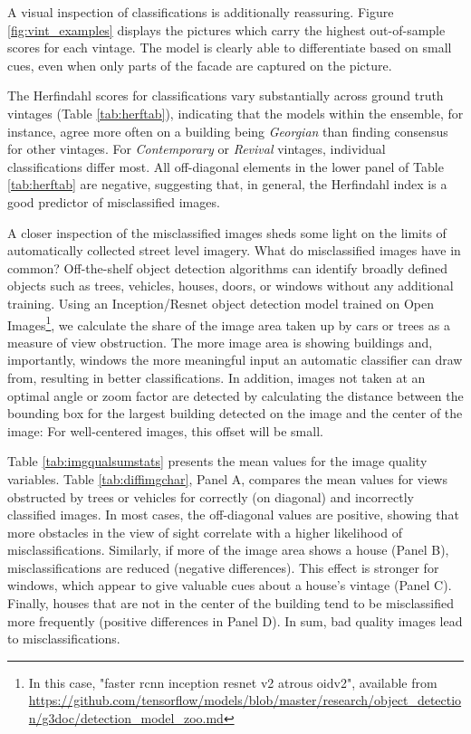 \documentclass[]{article}
\let\rmarkdownfootnote\footnote%
\def\footnote{\protect\rmarkdownfootnote}
\begin{document}
A visual inspection of classifications is additionally reassuring.
Figure \ref{fig:vint_examples} displays the pictures which carry the
highest out-of-sample scores for each vintage. The model is clearly able
to differentiate based on small cues, even when only parts of the facade
are captured on the picture.

The Herfindahl scores for classifications vary substantially across
ground truth vintages (Table \ref{tab:herftab}), indicating that the
models within the ensemble, for instance, agree more often on a building
being \emph{Georgian} than finding consensus for other vintages. For
\emph{Contemporary} or \emph{Revival} vintages, individual
classifications differ most. All off-diagonal elements in the lower
panel of Table \ref{tab:herftab} are negative, suggesting that, in
general, the Herfindahl index is a good predictor of misclassified
images.

A closer inspection of the misclassified images sheds some light on the
limits of automatically collected street level imagery. What do
misclassified images have in common? Off-the-shelf object detection
algorithms can identify broadly defined objects such as trees, vehicles,
houses, doors, or windows without any additional training. Using an
Inception/Resnet object detection model trained on Open
Images\footnote{In this case, "faster rcnn inception resnet v2 atrous oidv2", available from \url{https://github.com/tensorflow/models/blob/master/research/object_detection/g3doc/detection_model_zoo.md}},
we calculate the share of the image area taken up by cars or trees as a
measure of view obstruction. The more image area is showing buildings
and, importantly, windows the more meaningful input an automatic
classifier can draw from, resulting in better classifications. In
addition, images not taken at an optimal angle or zoom factor are
detected by calculating the distance between the bounding box for the
largest building detected on the image and the center of the image: For
well-centered images, this offset will be small.

Table \ref{tab:imgqualsumstats} presents the mean values for the image
quality variables. Table \ref{tab:diffimgchar}, Panel A, compares the
mean values for views obstructed by trees or vehicles for correctly (on
diagonal) and incorrectly classified images. In most cases, the
off-diagonal values are positive, showing that more obstacles in the
view of sight correlate with a higher likelihood of misclassifications.
Similarly, if more of the image area shows a house (Panel B),
misclassifications are reduced (negative differences). This effect is
stronger for windows, which appear to give valuable cues about a house's
vintage (Panel C). Finally, houses that are not in the center of the
building tend to be misclassified more frequently (positive differences
in Panel D). In sum, bad quality images lead to misclassifications.
\end{document}
